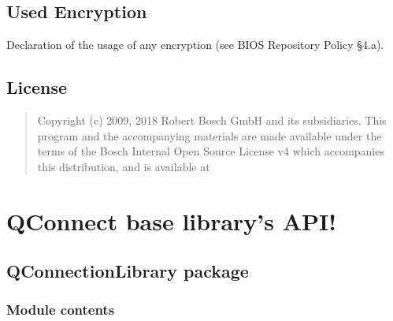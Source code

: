 \documentclass[letterpaper,10pt,english]{sphinxmanual}
\begin{document}
\section{Used Encryption}
\label{\detokenize{index:used-encryption}}
\sphinxAtStartPar
Declaration of the usage of any encryption (see BIOS Repository Policy
\S{}4.a).


\section{License}
\label{\detokenize{index:license}}
\sphinxAtStartPar
{\hyperref[\detokenize{index:license}]{\emph{}}}
\begin{quote}

\sphinxAtStartPar
Copyright (c) 2009, 2018 Robert Bosch GmbH and its subsidiaries. This
program and the accompanying materials are made available under the
terms of the Bosch Internal Open Source License v4 which accompanies
this distribution, and is available at
\end{quote}




\chapter{QConnect base library’s API!}
\label{\detokenize{index:qconnect-base-library-s-api}}

\section{QConnectionLibrary package}
\label{\detokenize{QConnectionLibrary:qconnectionlibrary-package}}\label{\detokenize{QConnectionLibrary::doc}}

\subsection{Module contents}
\label{\detokenize{QConnectionLibrary:module-QConnectionLibrary.connection_manager}}\label{\detokenize{QConnectionLibrary:module-contents}}
\end{document}
